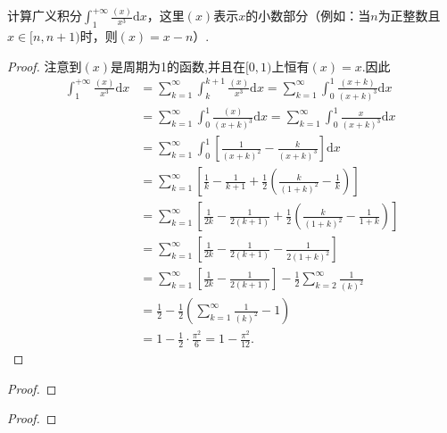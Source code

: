 \documentclass[../../main.tex]{subfiles}
\begin{document}
\begin{example}
计算广义积分$\int_{1}^{+\infty} \frac{(x)}{x^3} \mathrm{d}x$，这里$(x)$表示$x$的小数部分（例如：当$n$为正整数且$x \in [n, n+1)$时，则$(x) = x - n$）.
\end{example}
\begin{proof}
注意到$(x)$是周期为1的函数,并且在$[0,1)$上恒有$(x)=x$.因此
\begin{align*}
\int_1^{+\infty}{\frac{\left( x \right)}{x^3}\mathrm{d}x}&=\sum_{k=1}^{\infty}{\int_k^{k+1}{\frac{\left( x \right)}{x^3}\mathrm{d}x}}=\sum_{k=1}^{\infty}{\int_0^1{\frac{\left( x+k \right)}{\left( x+k \right) ^3}\mathrm{d}x}}
\\
&=\sum_{k=1}^{\infty}{\int_0^1{\frac{\left( x \right)}{\left( x+k \right) ^3}\mathrm{d}x}}=\sum_{k=1}^{\infty}{\int_0^1{\frac{x}{\left( x+k \right) ^3}\mathrm{d}x}}
\\
&=\sum_{k=1}^{\infty}{\int_0^1{\left[ \frac{1}{\left( x+k \right) ^2}-\frac{k}{\left( x+k \right) ^3} \right] \mathrm{d}x}}
\\
&=\sum_{k=1}^{\infty}{\left[ \frac{1}{k}-\frac{1}{k+1}+\frac{1}{2}\left( \frac{k}{\left( 1+k \right) ^2}-\frac{1}{k} \right) \right]}
\\
&=\sum_{k=1}^{\infty}{\left[ \frac{1}{2k}-\frac{1}{2\left( k+1 \right)}+\frac{1}{2}\left( \frac{k}{\left( 1+k \right) ^2}-\frac{1}{1+k} \right) \right]}
\\
&=\sum_{k=1}^{\infty}{\left[ \frac{1}{2k}-\frac{1}{2\left( k+1 \right)}-\frac{1}{2\left( 1+k \right) ^2} \right]}
\\
&=\sum_{k=1}^{\infty}{\left[ \frac{1}{2k}-\frac{1}{2\left( k+1 \right)} \right]}-\frac{1}{2}\sum_{k=2}^{\infty}{\frac{1}{\left( k \right) ^2}}
\\
&=\frac{1}{2}-\frac{1}{2}\left( \sum_{k=1}^{\infty}{\frac{1}{\left( k \right) ^2}}-1 \right) 
\\
&=1-\frac{1}{2}\cdot \frac{\pi ^2}{6}=1-\frac{\pi ^2}{12}.
\end{align*}
\end{proof}

\begin{example}

\end{example}
\begin{proof}

\end{proof}

\begin{example}

\end{example}
\begin{proof}

\end{proof}
\end{document}
